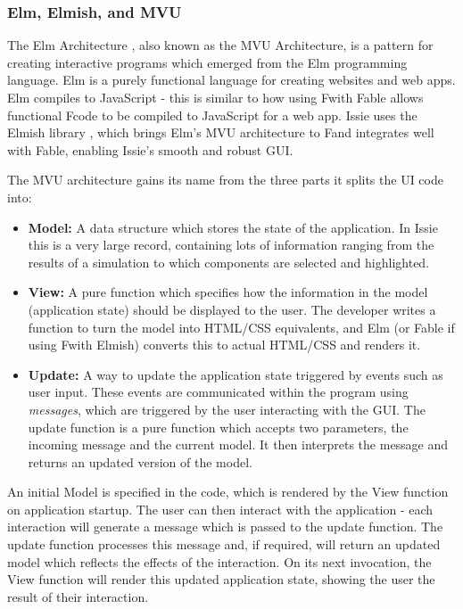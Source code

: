 \subsubsection{Elm, Elmish, and MVU}
The Elm Architecture \cite{elmarch}, also known as the MVU Architecture, is a pattern for creating interactive programs which emerged from the Elm programming language. Elm \cite{elm} is a purely functional language for creating websites and web apps. Elm compiles to JavaScript - this is similar to how using F\fsharp with Fable allows functional F\fsharp code to be compiled to JavaScript for a web app. Issie uses the Elmish library \cite{elmishdocs}, which brings Elm's MVU architecture to F\fsharp and integrates well with Fable, enabling Issie's smooth and robust GUI.

The MVU architecture gains its name from the three parts it splits the UI code into:
\begin{itemize}
    \item[] \textbf{Model:} A data structure which stores the state of the application. In Issie this is a very large record, containing lots of information ranging from the results of a simulation to which components are selected and highlighted.
    \item[] \textbf{View:} A pure function which specifies how the information in the model (application state) should be displayed to the user. The developer writes a function to turn the model into HTML/CSS equivalents, and Elm (or Fable if using F\fsharp with Elmish) converts this to actual HTML/CSS and renders it. 
    \item[] \textbf{Update:} A way to update the application state triggered by events such as user input. These events are communicated within the program using \textit{messages}, which are triggered by the user interacting with the GUI. The update function is a  pure function which accepts two parameters, the incoming message and the current model. It then interprets the message and returns an updated version of the model. 
\end{itemize}

An initial Model is specified in the code, which is rendered by the View function on application startup. The user can then interact with the application - each interaction will generate a message which is passed to the update function. The update function processes this message and, if required, will return an updated model which reflects the effects of the interaction. On its next invocation, the View function will render this updated application state, showing the user the result of their interaction.

